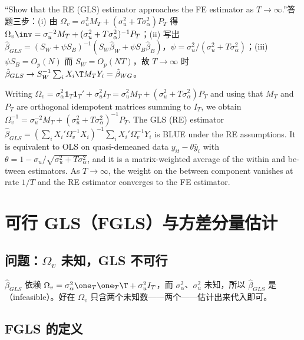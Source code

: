 \begin{keypt}[英文试卷常见问法]
“Show that the RE (GLS) estimator approaches the FE estimator as $T\to\infty$.”答题三步：(i) 由 $\Omega_v=\sigma_u^2M_T+(\sigma_u^2+T\sigma_\alpha^2)P_T$ 得 $\Omega_v\inv=\sigma_u^{-2}M_T+(\sigma_u^2+T\sigma_\alpha^2)^{-1}P_T$；(ii) 写出 $\hat\beta_{GLS}=(S_W+\psi S_B)^{-1}(S_W\hat\beta_W+\psi S_B\hat\beta_B)$，$\psi=\sigma_u^2/(\sigma_u^2+T\sigma_\alpha^2)$；(iii) $\psi S_B=O_p(N)$ 而 $S_W=O_p(NT)$，故 $T\to\infty$ 时 $\hat\beta_{GLS}\to S_W^{-1}\sum_iX_i\T M_TY_i=\hat\beta_{WG}$。
\end{keypt}

\begin{english}
Writing $\Omega_v=\sigma_\alpha^2\mathbf{1}_T\mathbf{1}_T'+\sigma_u^2I_T=\sigma_u^2M_T+(\sigma_u^2+T\sigma_\alpha^2)P_T$ and using that $M_T$ and $P_T$ are orthogonal idempotent matrices summing to $I_T$, we obtain $\Omega_v^{-1}=\sigma_u^{-2}M_T+(\sigma_u^2+T\sigma_\alpha^2)^{-1}P_T$. The GLS (RE) estimator $\hat\beta_{GLS}=(\sum_iX_i'\Omega_v^{-1}X_i)^{-1}\sum_iX_i'\Omega_v^{-1}Y_i$ is BLUE under the RE assumptions. It is equivalent to OLS on quasi-demeaned data $y_{it}-\theta\bar y_i$ with $\theta=1-\sigma_u/\sqrt{\sigma_u^2+T\sigma_\alpha^2}$, and it is a matrix-weighted average of the within and between estimators. As $T\to\infty$, the weight on the between component vanishes at rate $1/T$ and the RE estimator converges to the FE estimator.
\end{english}

\section{可行 GLS（FGLS）与方差分量估计}\label{sec:U11a-fgls}

\subsection{问题：\texorpdfstring{$\Omega_v$}{Omega\_v} 未知，GLS 不可行}

$\hat\beta_{GLS}$ 依赖 $\Omega_v=\sigma_\alpha^2\one_T\one_T\T+\sigma_u^2I_T$，而 $\sigma_\alpha^2$、$\sigma_u^2$ 未知，所以 $\hat\beta_{GLS}$ 是（infeasible）。好在 $\Omega_v$ 只含两个未知数——两个——估计出来代入即可。

\subsection{FGLS 的定义}

